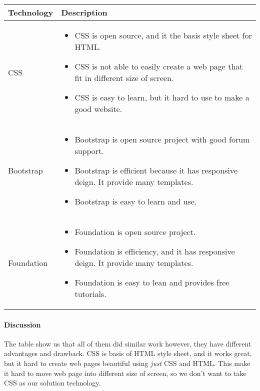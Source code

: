 \begin{center}
    \begin{tabular}{ | l | p{10cm} |}
    \hline
    Technology & Description  \\ \hline
    CSS \cite{CSS_intro}&
    \begin{itemize}
      \item CSS is open source, and it the basis style sheet for HTML.
      \item CSS is not able to easily create a web page that fit in different size of screen.
      \item CSS is easy to learn, but it hard to use to make a good website.
    \end{itemize}\\ \hline
    Bootstrap \cite{boot_intro}&
    \begin{itemize}
      \item Bootstrap is open source project with good forum support.
      \item Bootstrap is efficient because it has responsive deign. It provide many templates.
      \item Bootstrap is easy to learn and use.
    \end{itemize}\\ \hline
    Foundation \cite{foundation_intro}&
    \begin{itemize}
      \item Foundation is open source project.
      \item Foundation is efficiency, and it has responsive deign. It provide many templates.
      \item Foundation is easy to lean and provides free tutorials.
    \end{itemize}\\ \hline
    \end{tabular}
\end{center}

\paragraph{Discussion}

The table show us that all of them did similar work however, they have different advantages and drawback.
CSS is basis of HTML style sheet, and it works great, but it hard to create web pages beautiful using \textit{just} CSS and HTML.
This make it hard to move web page into different size of screen, so we don't want to take CSS as our solution technology.

